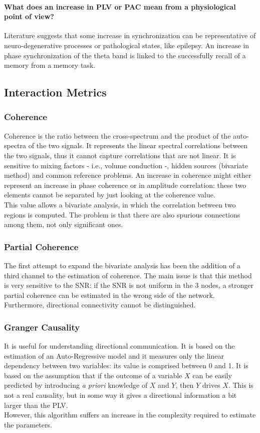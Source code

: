 \paragraph{What does an increase in PLV or PAC mean from a physiological point of view?}
Literature suggests that some increase in synchronization can be representative of neuro-degenerative
processes or pathological states, like epilepsy. An increase in phase synchronization of the theta band
is linked to the successfully recall of a memory from a memory task.

\subsection{Interaction Metrics}
\subsubsection{Coherence}
Coherence is the ratio between the cross-spectrum and the product of the auto-spectra of the two signals. It represents the linear spectral correlations between the two
signals, thus it cannot capture correlations that are not linear. It is sensitive to mixing factors - i.e., volume conduction -, hidden sources (bivariate method) and
common reference problems. An increase in coherence might either represent an increase in phase coherence or in amplitude correlation: these two elements cannot be
separated by just looking at the coherence value.\\
This value allows a bivariate analysis, in which the correlation between two regions is computed. The problem is that there are also spurious connections among them,
not only significant ones.
\subsubsection{Partial Coherence}
The first attempt to expand the bivariate analysis has been the addition of a third channel to the estimation of coherence. The main issue is that this method is very
sensitive to the SNR: if the SNR is not uniform in the 3 nodes, a stronger partial coherence can be estimated in the wrong side of the network. Furthermore, directional
connectivity cannot be distinguished.
\subsubsection{Granger Causality}
It is useful for understanding directional communication. It is based on the estimation of an Auto-Regressive model and it measures only the linear dependency between
two variables: its value is comprised between 0 and 1. It is based on the assumption that if the outcome of a variable \(X\) can be easily predicted by introducing
\textit{a priori} knowledge of \(X\) and \(Y\), then \(Y\) drives \(X\). This is not a real causality, but in some way it gives a directional information a bit larger
than the PLV.\\
However, this algorithm suffers an increase in the complexity required to estimate the parameters.
